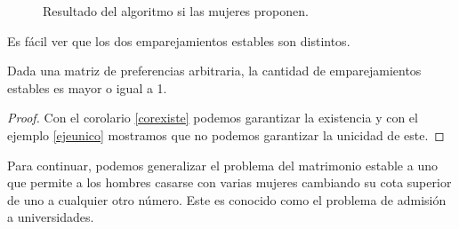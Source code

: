 \begin{eje}
\begin{figure}[H]

\caption{Resultado del algoritmo si las mujeres proponen.}
\end{figure}

Es fácil ver que los dos emparejamientos estables son distintos.
\fin
\end{eje}

\begin{cor}
Dada una matriz de preferencias arbitraria, la cantidad de emparejamientos estables es mayor o igual a 1. 
\end{cor}
\begin{proof}
Con el corolario \ref{corexiste} podemos garantizar la existencia y con el ejemplo \ref{ejeunico} mostramos que no podemos garantizar la unicidad de este.
\end{proof}

Para continuar, podemos generalizar el problema del matrimonio estable a uno que permite a los hombres casarse con varias mujeres cambiando su cota superior de uno a cualquier otro número. Este es conocido como el problema de admisión a universidades. 

